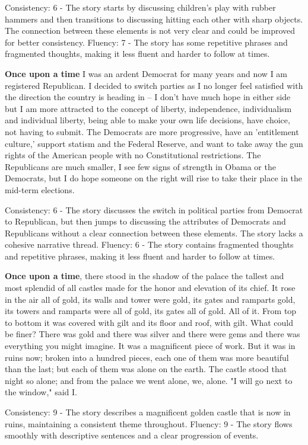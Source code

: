 \documentclass{article}
\begin{document}
Consistency: 6 - The story starts by discussing children's play with rubber hammers and then transitions to discussing hitting each other with sharp objects. The connection between these elements is not very clear and could be improved for better consistency.
Fluency: 7 - The story has some repetitive phrases and fragmented thoughts, making it less fluent and harder to follow at times.

\textbf{Once upon a time} I was an ardent Democrat for many years and now I am registered Republican. I decided to switch parties as I no longer feel satisfied with the direction the country is heading in – I don't have much hope in either side but I am more attracted to the concept of liberty, independence, individualism and individual liberty, being able to make your own life decisions, have choice, not having to submit. The Democrats are more progressive, have an 'entitlement culture,' support statism and the Federal Reserve, and want to take away the gun rights of the American people with no Constitutional restrictions. The Republicans are much smaller, I see few signs of strength in Obama or the Democrats, but I do hope someone on the right will rise to take their place in the mid-term elections.

Consistency: 6 - The story discusses the switch in political parties from Democrat to Republican, but then jumps to discussing the attributes of Democrats and Republicans without a clear connection between these elements. The story lacks a cohesive narrative thread.
Fluency: 6 - The story contains fragmented thoughts and repetitive phrases, making it less fluent and harder to follow at times.

\textbf{Once upon a time}, there stood in the shadow of the palace the tallest and most splendid of all castles made for the honor and elevation of its chief. It rose in the air all of gold, its walls and tower were gold, its gates and ramparts gold, its towers and ramparts were all of gold, its gates all of gold. All of it. From top to bottom it was covered with gilt and its floor and roof, with gilt. What could be finer? There was gold and there was silver and there were gems and there was everything you might imagine. It was a magnificent piece of work. But it was in ruins now; broken into a hundred pieces, each one of them was more beautiful than the last; but each of them was alone on the earth. The castle stood that night so alone; and from the palace we went alone, we, alone. "I will go next to the window," said I.

Consistency: 9 - The story describes a magnificent golden castle that is now in ruins, maintaining a consistent theme throughout.
Fluency: 9 - The story flows smoothly with descriptive sentences and a clear progression of events.
\end{document}
